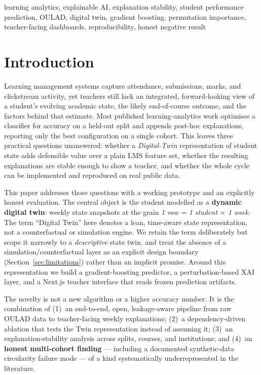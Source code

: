 \documentclass[conference]{IEEEtran}
\begin{document}
\begin{IEEEkeywords}
learning analytics, explainable AI, explanation stability, student performance
prediction, OULAD, digital twin, gradient boosting, permutation importance,
teacher-facing dashboards, reproducibility, honest negative result
\end{IEEEkeywords}

\section{Introduction}
Learning management systems capture attendance, submissions, marks, and
clickstream activity, yet teachers still lack an integrated, forward-looking
view of a student's evolving academic state, the likely end-of-course outcome,
and the factors behind that estimate. Most published learning-analytics work
optimises a classifier for accuracy on a held-out split and appends post-hoc
explanations, reporting only the best configuration on a single cohort. This
leaves three practical questions unanswered: whether a \emph{Digital-Twin}
representation of student state adds defensible value over a plain LMS feature
set, whether the resulting explanations are stable enough to show a teacher, and
whether the whole cycle can be implemented and reproduced on real public data.

This paper addresses those questions with a working prototype and an explicitly
honest evaluation. The central object is the student modelled as a
\textbf{dynamic digital twin}: weekly state snapshots at the grain
\emph{1 row = 1 student $\times$ 1 week}. The term ``Digital Twin'' here denotes
a lean, time-aware state representation, not a counterfactual or simulation
engine. We retain the term deliberately but scope it narrowly to a
\emph{descriptive} state twin, and treat the absence of a
simulation/counterfactual layer as an explicit design boundary
(Section~\ref{sec:limitations}) rather than an implicit promise. Around this
representation we build a gradient-boosting predictor, a perturbation-based XAI
layer, and a Next.js teacher interface that reads frozen prediction artifacts.

The novelty is not a new algorithm or a higher accuracy number. It is the
combination of (1)~an end-to-end, open, leakage-aware pipeline from raw OULAD
data to teacher-facing weekly explanations; (2)~a dependency-driven ablation that
tests the Twin representation instead of assuming it; (3)~an explanation-stability
analysis across splits, courses, and institutions; and (4)~an \textbf{honest
multi-cohort finding} --- including a documented synthetic-data circularity
failure mode --- of a kind systematically underrepresented in the literature.
\end{document}
